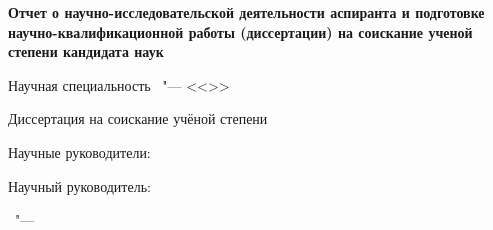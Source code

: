 \thispagestyle{empty}
\begin{center}
\thesisOrganization
\end{center}
%
\vspace{0pt plus4fill} %
\begin{center}
\textbf {\large Отчет о научно-исследовательской деятельности аспиранта и подготовке научно-квалификационной работы
(диссертации) на соискание ученой степени кандидата наук}
\end{center}
%
\begin{center}
{\large %
\thesisTitle}

\vspace{0pt plus2fill} %
\begin{minipage}[b]{0.5\linewidth}
    \begin{flushright}
        Научная специальность \thesisSpecialtyNumber\ "---
        <<\thesisSpecialtyTitle>>
    \end{flushright}
  \end{minipage}

\vspace{0pt plus2fill} %
Диссертация на соискание учёной степени

\thesisDegree
\end{center}
%
\vspace{0pt plus4fill} %
\begin{flushright}
\ifdefined\supervisorTwoFio
Научные руководители:

\supervisorRegalia

\ifdefined\supervisorDead
\framebox{\supervisorFio}
\else
\supervisorFio
\fi

\supervisorTwoRegalia

\ifdefined\supervisorTwoDead
\framebox{\supervisorTwoFio}
\else
\supervisorFio
\fi
\else
Научный руководитель:

\supervisorRegalia

\ifdefined\supervisorDead
\framebox{\supervisorFio}
\else
\supervisorFio
\fi
\fi

\end{flushright}
%
\vspace{0pt plus4fill} %
{\centering\thesisCity\ "--- \thesisYear\par}
